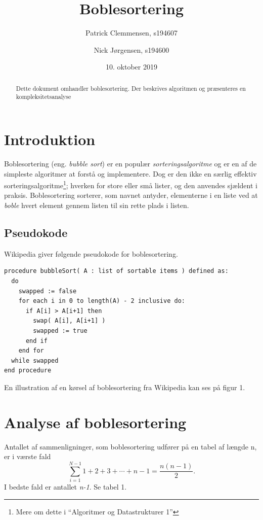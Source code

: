 \documentclass{article}
\title{\huge Boblesortering}
\author{Patrick Clemmensen, s194607 \and Nick Jørgensen, s194600}
\date{10. oktober 2019}
\begin{document}
\maketitle



\begin{abstract}
Dette dokument omhandler boblesortering. Der beskrives algoritmen og præsenteres en kompleksitetsanalyse
\end{abstract}

\section{Introduktion}
Boblesortering (eng. \textit{bubble sort}) er en populær \textit{sorteringsalgoritme} og er en af de simpleste algoritmer at forstå og implementere. Dog er den ikke en særlig effektiv sorteringsalgoritme\footnote[1]{Mere om dette i “Algoritmer og Datastrukturer 1”}; hverken for store eller små lister, og den anvendes sjældent i praksis. Boblesortering sorterer, som navnet antyder, elementerne i en liste ved at \textit{boble} hvert element gennem listen til sin rette plads i listen.

\subsection{Pseudokode}
Wikipedia {\cite{2}} giver følgende pseudokode for boblesortering.

\begin{verbatim}
procedure bubbleSort( A : list of sortable items ) defined as:
  do
    swapped := false
    for each i in 0 to length(A) - 2 inclusive do:
      if A[i] > A[i+1] then
        swap( A[i], A[i+1] )
        swapped := true
      end if
    end for
  while swapped
end procedure
\end{verbatim}
En illustration af en kørsel af boblesortering fra Wikipedia kan ses på figur 1.


\section{Analyse af boblesortering}
Antallet af sammenligninger, som boblesortering udfører på en tabel af længde n, er i værste fald
\begin{equation}
  \sum \limits_{i = 1}^{N-1} 1+2+3+\cdots+n-1 = \frac{n(n-1)}{2}.
\end{equation}
I bedste fald er antallet \textit{n-1}. Se tabel 1.
\newpage
\end{document}
